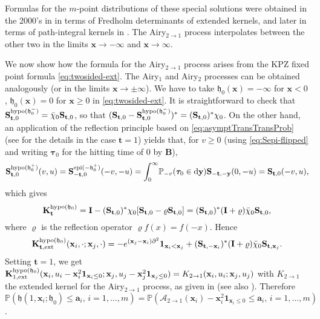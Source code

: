 \documentclass[letterpaper,reqno,11pt,oneside,final]{amsart}
\theoremstyle{definition}
\newcommand{\fh}{\mathfrak{h}}
\newcommand{\pp}{\mathbb{P}}
\newcommand{\Bt}{{\mathcal{A}}_{2\to 1}}
\newcommand{\p}{\partial}
\newcommand{\uno}[1]{\mathbf{1}_{#1}}
\newcommand{\uptext}[1]{\text{\upshape{#1}}}
\DeclareMathOperator{\epi}{\uptext{epi}}
\DeclareMathOperator{\hypo}{\uptext{hypo}}
\renewcommand{\d}{\mathrm{d}}
\newcommand{\fT}{\mathbf{S}}
\newcommand{\ft}{\mathbf{t}}
\newcommand{\fx}{\mathbf{x}}
\newcommand{\fy}{\mathbf{y}}
\newcommand{\fa}{\mathbf{a}}
\newcommand{\fB}{\mathbf{B}}
\newcommand{\fK}{\mathbf{K}}
\newcommand{\fI}{\mathbf{I}}
\newcommand{\ftau}{\bm{\tau}}
\renewcommand{\P}{\chi}
\numberwithin{equation}{section}
\begin{document}
Formulas for the $m$-point distributions of these special solutions were obtained in the 2000's in \cite{prahoferSpohn,johansson,sasImamPolyHalf,sasamoto,borFerPrahSasam,bfp,bfs} in terms of Fredholm determinants of extended kernels, and later in terms of path-integral kernels in \cite{cqr,quastelRemAiry1,bcr}.  
The Airy$_{2\to1}$ process interpolates between the other two in the limits $\fx\to-\infty$ and $\fx\to\infty$.

We now show how the formula for the Airy$_{2\to1}$ process arises from the KPZ fixed point formula \eqref{eq:twosided-ext}.
The Airy$_1$ and Airy$_2$ processes can be obtained analogously (or in the limits $\fx\to\pm\infty$).
We have to take  $\fh_0(\fx) = -\infty$ for $\fx<0$, $\fh_0(\fx) = 0$ for $\fx\geq0$ in \eqref{eq:twosided-ext}.
It is straightforward to check that $\fT^{\hypo(\fh_0^-)}_{\ft,0}=\bar\P_0\fT_{\ft,0}$, so that $(\fT_{\ft,0}-\fT^{\hypo(\fh_0^-)}_{\ft,0})^*=(\fT_{\ft,0})^*\P_0$.
On the other hand, an application of the reflection principle based on \eqref{eq:asymptTransTransProb} (see \cite[Prop. 3.6]{flat} for the details in the case $\ft=1$) yields that, for $v\geq0$ (using \eqref{eq:Sepi-flipped} and writing $\ftau_0$ for the hitting time of $0$ by $\fB$),
\[\fT^{\hypo(\fh_0^+)}_{\ft,0}(v,u)=\fT^{\epi(-\fh_0^+)}_{-\ft,0}(-v,-u)=\int_0^\infty\!\pp_{-v}(\ftau_0\in\d\fy)\fT_{-\ft,-\fy}(0,-u)=\fT_{\ft,0}(-v,u),\]
which gives
\[\fK^{\hypo(\fh_0)}_{\ft}=\fI-(\fT_{\ft,0})^*\P_0[\fT_{\ft,0}-\varrho\fT_{\ft,0}]=(\fT_{\ft,0})^*(\fI+\varrho)\bar \P_0\fT_{\ft,0},\]
where $\varrho$ is the reflection operator $\varrho f(x)=f(-x)$.
Hence
\[\fK^{\hypo(\fh_0)}_{\ft,\uptext{ext}}(\fx_i,\cdot;\fx_j,\cdot)=-e^{(\fx_j-\fx_i)\p^2}\uno{\fx_i<\fx_j}+(\fT_{\ft,-\fx_i})^*(\fI+\varrho)\bar \P_0\fT_{\ft,\fx_j}.\]
Setting $\ft=1$, we get $\fK^{\hypo(\fh_0)}_{1,\uptext{ext}}(\fx_i,u_i-\fx_i^2\uno{\fx_i\leq0};\fx_j,u_j-\fx_j^2\uno{\fx_j\leq0})=K_{2\to1}(\fx_i,u_i;\fx_j,u_j)$ with $K_{2\to1}$ the extended kernel for the Airy$_{2\to1}$ process, as given in \cite[Eq. 1.8]{qr-airy1to2} (see also \cite{bfs}).
Therefore $\pp\!\left(\fh(1,\fx_i;\fh_0)\leq\fa_i,\,i=1,\dotsc,m\right)=\pp\!\left(\Bt(\fx_i)-\fx_i^2\uno{\fx_i\leq0}\leq \fa_i,\,i=1,\dotsc,m\right)$.
\end{document}
